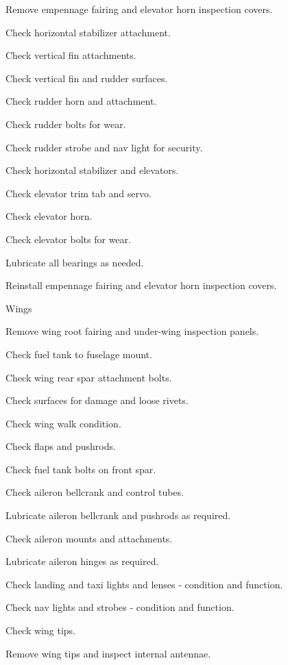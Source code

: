 \begin{enumerate*}
\begin{enumerate*}
		\item Remove empennage fairing and elevator horn inspection covers. 
		\item Check horizontal stabilizer attachment. 
		\item Check vertical fin attachments. 
		\item Check vertical fin and rudder surfaces. 
		\item Check rudder horn and attachment. 
		\item Check rudder bolts for wear. 
		\item Check rudder strobe and nav light for security. 
		\item Check horizontal stabilizer and elevators. 
		\item Check elevator trim tab and servo. 
		\item Check elevator horn. 
		\item Check elevator bolts for wear. 
		\item Lubricate all bearings as needed. 
		\item Reinstall empennage fairing and elevator horn inspection covers. 
	\end{enumerate*}
	\item{Wings} 
	\begin{enumerate*}
		\item Remove wing root fairing and under-wing inspection panels. 
		\item Check fuel tank to fuselage mount.
		\item Check wing rear spar attachment bolts.
		\item Check surfaces for damage and loose rivets. 
		\item Check wing walk condition.
		\item Check flaps and pushrods.
		\item Check fuel tank bolts on front spar.
		\item Check aileron bellcrank and control tubes.
		\item Lubricate aileron bellcrank and pushrods as required.
		\item Check aileron mounts and attachments.
		\item Lubricate aileron hinges as required.
		\item Check landing and taxi lights and lenses - condition and function.
		\item Check nav lights and strobes - condition and function.
		\item Check wing tips.
		\item Remove wing tips and inspect internal antennae.

\end{enumerate*}
\end{enumerate*}
